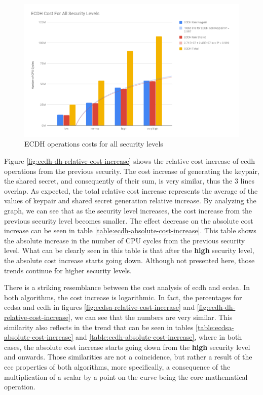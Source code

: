 \documentclass{llncs}
\begin{document}
\begin{figure}
  \centering
  \includegraphics[width=1.0\textwidth]{img/ecdh_cost_all_sls.png}
  \centering \caption{\label{fig:ecdh-costs-all-sls} ECDH operations costs for all security levels}
\end{figure}

Figure \ref{fig:ecdh-dh-relative-cost-increase} shows the relative cost increase of \gls{ecdh} operations from the previous security.
The cost increase of generating the keypair, the shared secret, and consequently of their sum, is very similar, thus the $3$ lines overlap.
As expected, the total relative cost increase represents the average of the values of keypair and shared secret generation relative increase.
By analyzing the graph, we can see  that as the security level increases, the cost increase  from the previous security
level becomes smaller. The effect decrease on the absolute cost increase can be seen in table \ref{table:ecdh-absolute-cost-increase}.
This table shows the absolute increase in the number of CPU cycles from
the previous security level. What can be clearly seen in this table is that after the \textbf{high} security level, the absolute cost increase starts
going down. Although not presented here, those trends continue for higher security levels.

There is a striking resemblance between the cost analysis of \gls{ecdh} and \gls{ecdsa}. In both algorithms, the cost increase is logarithmic.
In fact, the percentages for \gls{ecdsa} and \gls{ecdh} in figures \ref{fig:ecdsa-relative-cost-incerase}
and \ref{fig:ecdh-dh-relative-cost-increase}, we can see that the numbers are very similar. This similarity also reflects in the
trend that can be seen in tables \ref{table:ecdsa-absolute-cost-increase} and \ref{table:ecdh-absolute-cost-increase}, where in both cases, the
absolute cost increase starts going down from the \textbf{high} security level and onwards. Those similarities are not a coincidence, but rather
a result of the \gls{ecc} properties of both algorithms, more specifically, a consequence of the multiplication of a scalar by a point on
the curve being the core mathematical operation.
\end{document}

